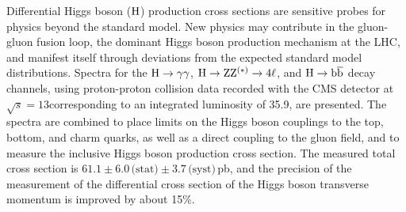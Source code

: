% 
Differential Higgs boson ($\mathrm{H}$) production cross sections are sensitive probes for physics beyond the standard model.
% 
New physics may contribute in the gluon-gluon fusion loop, the dominant Higgs boson production mechanism at the LHC, and manifest itself through deviations from the expected standard model distributions.
% 
% 
Spectra for the $\mathrm{H}\to\mathrm{\gamma}\mathrm{\gamma}$, $\mathrm{H}\to\mathrm{Z}\mathrm{Z}^{(\ast)}\to 4\ell$, and $\mathrm{H}\to\mathrm{b}\overline{\mathrm{b}}$ decay channels, using proton-proton collision data recorded with the CMS detector at $\sqrt{s}=13$\TeV corresponding to an integrated luminosity of 35.9\fbinv, are presented.
% 
The spectra are combined to place limits on the Higgs boson couplings to the top, bottom, and charm quarks, as well as a direct coupling to the gluon field, and to measure the inclusive Higgs boson production cross section.
% 
The measured total cross section is $61.1   \pm 6.0 \,\text{(stat)}   \pm 3.7 \,\text{(syst)} \,$pb, and the precision of the measurement of the differential cross section of the Higgs boson transverse momentum is improved by about 15\%.